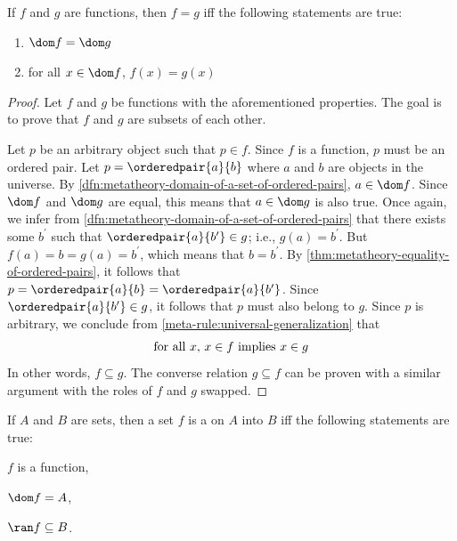 \begin{thm}
     \label{thm:metatheory-function-equality}
    If \( f \) and \( g \) are functions, then \( f = g \) iff the following statements are true:
    \begin{enumerate}[topsep=2pt,label=\textup{\texttt{(\alph*)}}]
        \item \( \dom f = \dom g \)
        \item for all \( x \in \dom f \), \( f(x) = g(x) \)
    \end{enumerate}
\end{thm}

\begin{proof}
    Let \( f \) and \( g \) be functions with the aforementioned properties.
    The goal is to prove that \( f \) and \( g \) are subsets of each other.

    \vspace{0.3cm}
    \noindent
    Let \( p \) be an arbitrary object such that \( p \in f \).
    Since \( f \) is a function, \( p \) must be an ordered pair.
    Let \( p = \orderedpair{a}{b} \) where \( a \) and \( b \) are objects in the universe.
    By \cref{dfn:metatheory-domain-of-a-set-of-ordered-pairs}, \( a \in \dom f \).
    Since \( \dom f \) and \( \dom g \) are equal, this means that \( a \in \dom g \) is also true.
    Once again, we infer from \cref{dfn:metatheory-domain-of-a-set-of-ordered-pairs} that there exists some \( b^{\prime} \)
    such that \( \orderedpair{a}{b^{\prime}} \in g \); i.e., \( g(a) = b^{\prime} \).
    But \( f(a) = b = g(a) = b^{\prime} \), which means that \( b = b^{\prime} \).
    By \cref{thm:metatheory-equality-of-ordered-pairs}, it follows that \( p = \orderedpair{a}{b} = \orderedpair{a}{b^{\prime}} \).
    Since \( \orderedpair{a}{b^{\prime}} \in g \), it follows that \( p \) must also belong to \( g \).
    Since \( p \) is arbitrary, we conclude from \cref{meta-rule:universal-generalization} that
    \begin{equation*}
        \text{for all \( x \), \( x \in f \) implies \( x \in g \)}
    \end{equation*}
    In other words, \( f \subseteq g \). The converse relation \( g \subseteq f \) can be proven with a similar argument with the roles of \( f \) and \( g \)
    swapped.
\end{proof}

\begin{dfn}
     \label{dfn:metatheory-functions-in-terms-of-two-sets}
    If \( A \) and \( B \) are sets, then a set \( f \) is a  on \( A \) into \( B \) iff the following statements are true:
    \begin{enumerate*}[label=(\roman*)]
        \item \( f \) is a function,
        \item \( \dom f = A \),
        \item \( \ran f \subseteq B \).
    \end{enumerate*}
\end{dfn}

